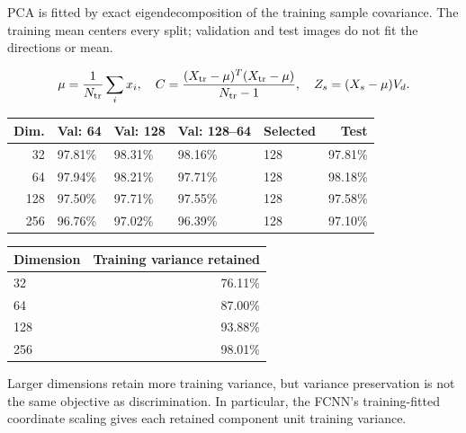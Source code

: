 \documentclass[11pt,a4paper]{article}
\begin{document}
PCA is fitted by exact eigendecomposition of the training sample covariance. The training mean centers every split; validation and test images do not fit the directions or mean.


\[\mu=\frac{1}{N_{\rm tr}}\sum_i x_i,\quad C=\frac{(X_{\rm tr}-\mu)^T(X_{\rm tr}-\mu)}{N_{\rm tr}-1},\quad Z_s=(X_s-\mu)V_d.\]

\begingroup\small\setlength{\tabcolsep}{5pt}

\begin{tabularx}{\linewidth}{rYYYlr}

\toprule

\textbf{Dim.} & \textbf{Val: 64} & \textbf{Val: 128} & \textbf{Val: 128--64} & \textbf{Selected} & \textbf{Test} \\

\midrule

32 & 97.81\% & 98.31\% & 98.16\% & 128 & 97.81\% \\

64 & 97.94\% & 98.21\% & 97.71\% & 128 & 98.18\% \\

128 & 97.50\% & 97.71\% & 97.55\% & 128 & 97.58\% \\

256 & 96.76\% & 97.02\% & 96.39\% & 128 & 97.10\% \\

\bottomrule\end{tabularx}\endgroup\par\medskip

\begingroup\small\setlength{\tabcolsep}{5pt}

\begin{tabularx}{\linewidth}{Yr}

\toprule

\textbf{Dimension} & \textbf{Training variance retained} \\

\midrule

32 & 76.11\% \\

64 & 87.00\% \\

128 & 93.88\% \\

256 & 98.01\% \\

\bottomrule\end{tabularx}\endgroup\par\medskip

Larger dimensions retain more training variance, but variance preservation is not the same objective as discrimination. In particular, the FCNN's training-fitted coordinate scaling gives each retained component unit training variance.
\end{document}
